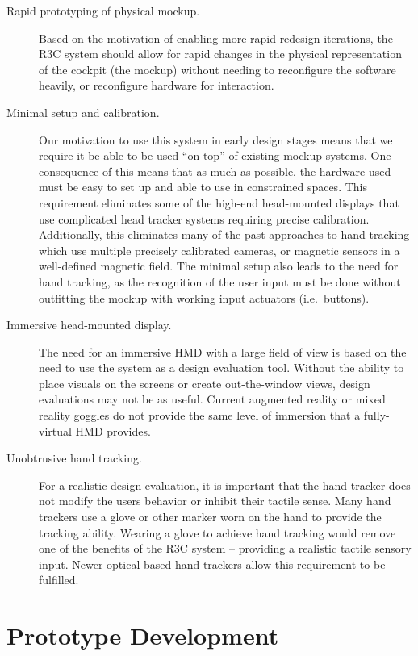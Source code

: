 \begin{description}
    \item [Rapid prototyping of physical mockup.]
        Based on the motivation of enabling more rapid redesign iterations, the R3C system should allow for rapid changes in the physical representation of the cockpit (the mockup) without needing to reconfigure the software heavily, or reconfigure hardware for interaction.
    \item [Minimal setup and calibration.]
        Our motivation to use this system in early design stages means that we require it be able to be used ``on top'' of existing mockup systems.
        One consequence of this means that as much as possible, the hardware used must be easy to set up and able to use in constrained spaces.
        This requirement eliminates some of the high-end head-mounted displays that use complicated head tracker systems requiring precise calibration.
        Additionally, this eliminates many of the past approaches to hand tracking which use multiple precisely calibrated cameras, or magnetic sensors in a well-defined magnetic field.
        The minimal setup also leads to the need for hand tracking, as the recognition of the user input must be done without outfitting the mockup with working input actuators (i.e.\ buttons).
    \item [Immersive head-mounted display.]
        The need for an immersive HMD with a large field of view is based on the need to use the system as a design evaluation tool.
        Without the ability to place visuals on the screens or create out-the-window views, design evaluations may not be as useful.
        Current augmented reality or mixed reality goggles do not provide the same level of immersion that a fully-virtual HMD provides.
    \item [Unobtrusive hand tracking.]
        For a realistic design evaluation, it is important that the hand tracker does not modify the users behavior or inhibit their tactile sense.
        Many hand trackers use a glove or other marker worn on the hand to provide the tracking ability.
        Wearing a glove to achieve hand tracking would remove one of the benefits of the R3C system -- providing a realistic tactile sensory input.
        Newer optical-based hand trackers allow this requirement to be fulfilled.
\end{description}

\section{Prototype Development}

